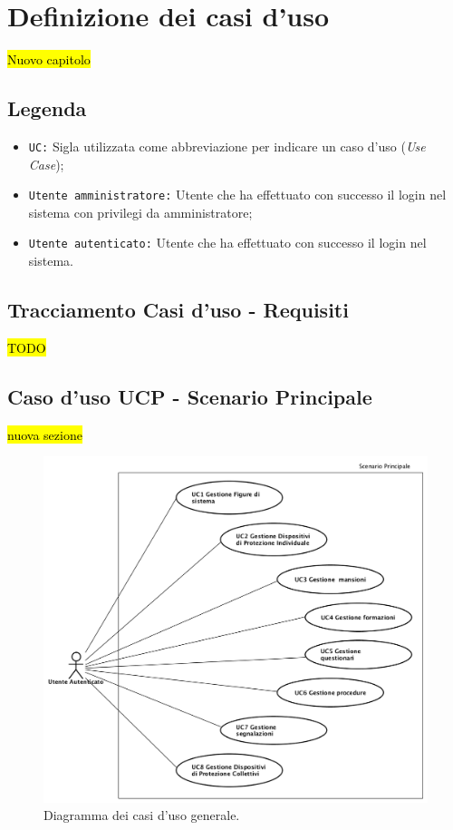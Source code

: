 \cleardoublepage

\section{Definizione dei casi d'uso}
\hl{Nuovo capitolo}
	\subsection{Legenda}
	\begin{itemize}
		\item \texttt{UC:} Sigla utilizzata come abbreviazione per indicare un caso d'uso (\textit{Use Case});
		\item \texttt{Utente amministratore:} Utente che ha effettuato con successo il login nel sistema con privilegi da amministratore;
		\item \texttt{Utente autenticato:} Utente che ha effettuato con successo il login nel sistema.
	\end{itemize}
	
	\subsection{Tracciamento Casi d'uso - Requisiti}
		\hl{TODO}
	\subsection{Caso d'uso UCP - Scenario Principale }
	\hl{nuova sezione} \\
	\begin{figure}[H]
		\begin{center}
			\includegraphics[width=14cm]{Pics/Diagramma_generale_dei_casi_d_uso.png}
			\caption{
				Diagramma dei casi d'uso generale.}
			\label{fig:DiagrammaGeneraleCasiDuso}
		\end{center}
	\end{figure}	
	
